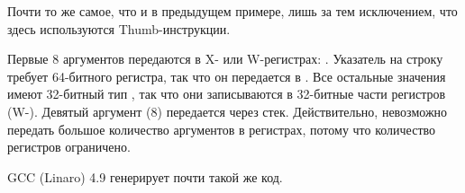 Почти то же самое, что и в предыдущем примере,
лишь за тем исключением, что здесь используются Thumb-инструкции.






Первые 8 аргументов передаются в X- или W-регистрах: \ARMPCS.
Указатель на строку требует 64-битного регистра, так что он передается в .
Все остальные значения имеют 32-битный тип \Tint, так что они записываются в 32-битные части регистров (W-).
Девятый аргумент (8) передается через стек.
Действительно, невозможно передать большое количество аргументов в регистрах, потому что количество регистров ограничено.

\Optimizing GCC (Linaro) 4.9 генерирует почти такой же код.
